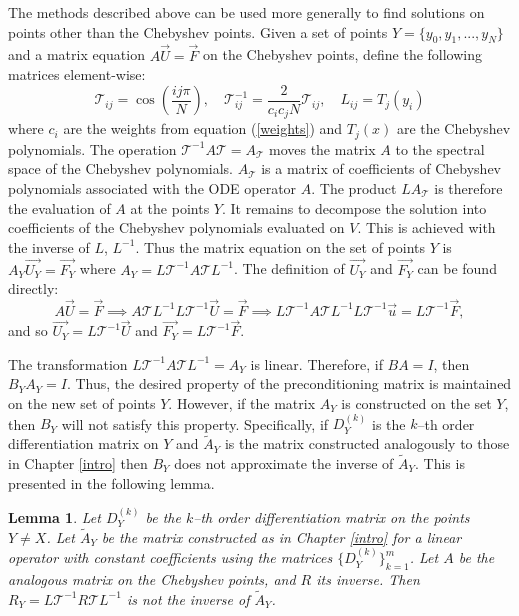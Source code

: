 \documentclass{sfuthesis}
\newtheorem{lemma}{Lemma}
\begin{document}
The methods described above can be used more generally to find solutions on points other than the Chebyshev points.
Given a set of points $Y = \{y_0, y_1, ... , y_N\}$ and a matrix equation $A \vec{U} = \vec{F}$ on the Chebyshev points,%
define the following matrices element-wise:
\begin{equation}
\mathcal{T}_{ij} = \cos \left ( \frac{i j \pi}{N} \right ), \quad \mathcal{T}^{-1}_{ij} = \frac{2}{c_i c_j N} \mathcal{T}_{ij}, \quad L_{ij} = T_j(y_i)
\end{equation}
where $c_i$ are the weights from equation (\ref{weights}) and $T_j(x)$ are the Chebyshev polynomials.
The operation $\mathcal{T}^{-1} A \mathcal{T} = A_{\mathcal{T}}$ moves the matrix $A$ to the spectral space of the Chebyshev polynomials.
$A_{\mathcal{T}}$ is a matrix of coefficients of Chebyshev polynomials associated with the ODE operator $A$.
The product $L A_{\mathcal{T}}$ is therefore the evaluation of $A$ at the points $Y$.
It remains to decompose the solution into coefficients of the Chebyshev polynomials evaluated on $V$.
This is achieved with the inverse of $L$, $L^{-1}$.
Thus the matrix equation on the set of points $Y$ is $A_Y \vec{U_Y} = \vec{F_Y}$ where $A_Y = L \mathcal{T}^{-1} A \mathcal{T} L^{-1}$.
The definition of $\vec{U_Y}$ and $\vec{F_Y}$ can be found directly:
\begin{equation}
A \vec{U} = \vec{F} \implies A \mathcal{T} L^{-1} L \mathcal{T}^{-1} \vec{U} = \vec{F} \implies L \mathcal{T}^{-1} A \mathcal{T} L^{-1} L \mathcal{T}^{-1} \vec{u} = L \mathcal{T}^{-1} \vec{F},
\end{equation}
and so $\vec{U_Y} = L \mathcal{T}^{-1} \vec{U}$ and $\vec{F_Y} = L \mathcal{T}^{-1} \vec{F}$.

The transformation $L \mathcal{T}^{-1} A \mathcal{T} L^{-1} = A_Y$ is linear.
Therefore, if $B A = I$, then $B_Y A_Y = I$.
Thus, the desired property of the preconditioning matrix is maintained on the new set of points $Y$.
However, if the matrix $A_Y$ is constructed on the set $Y$, then $B_Y$ will not satisfy this property.
Specifically, if $D^{(k)}_Y$ is the $k$--th order differentiation matrix on $Y$ and $\tilde{A}_Y$ is the matrix constructed analogously to those in Chapter \ref{intro} then $B_Y$ does not approximate the inverse of $\tilde{A}_Y$.
This is presented in the following lemma.

\begin{lemma}
Let $D^{(k)}_Y$ be the $k$--th order differentiation matrix on the points $Y \neq X$.
Let $\tilde{A}_Y$ be the matrix constructed as in Chapter \ref{intro} for a linear operator with constant coefficients using the matrices $\{ D^{(k)}_Y \}_{k=1}^m$.
Let $A$ be the analogous matrix on the Chebyshev points, and $R$ its inverse.
Then $R_Y = L \mathcal{T}^{-1} R \mathcal{T} L^{-1}$ is not the inverse of $\tilde{A}_Y$.
\end{lemma}
\end{document}
